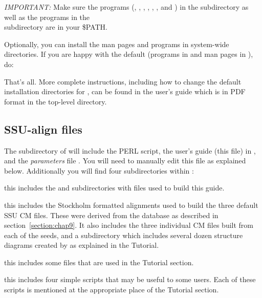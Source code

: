 \emph{IMPORTANT:}
Make sure the  programs (, 
, , , ,
, and ) in the  subdirectory
as well as the  programs in the \\ 
subdirectory are in your \$PATH.

Optionally, you can install the man pages and programs in system-wide
directories. If you are happy with the default (programs in
 and man pages in ),
do:


That's all.  More complete instructions, including how to
change the default installation directories for ,
can be found in the  user's guide which is in 
PDF format in the top-level  directory. 

\subsection{SSU-align files}
The  subdirectory of  will include
the  PERL script, the user's guide (this file) in
, and the \emph{parameters} file 
. You will need to manually edit this file as
explained below. Additionally you will find four subdirectories
within :

\begin{wideitem}

\item[\emprog{documentation}] this includes the  and
   subdirectories with files used to build this
  guide.

\item[\emprog{seeds}] this includes the Stockholm formatted alignments
  used to build the three default SSU CM files. These were derived
  from the  database \cite{CannoneGutell02} as described in
  section~\ref{section:chap9}. It also includes the three individual CM
  files built from each of the seeds, and a subdirectory
   which includes several dozen structure diagrams
  created by  as explained in the Tutorial.

\item[\emprog{tutorial}] this includes some files that are used in the
  Tutorial section.

\item[\emprog{scripts}] this includes four simple 
  scripts that may be useful to some users. Each of these scripts is
  mentioned at the appropriate place of the Tutorial section.

\end{wideitem}

